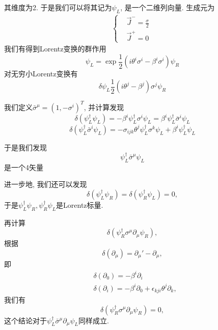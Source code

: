 \begin{example}
    其维度为2. 于是我们可以将其记为$\psi_L$, 是一个二维列向量. 生成元为
    \begin{align}
        \begin{cases}
            &\vec J^-=\frac{\sigma}2\\
            &\vec J^+=0\
        \end{cases}
    \end{align}
    我们有得到Lorentz变换的群作用
    \begin{equation}
        \psi_L=\exp{\frac12(i\theta^i\sigma^i-\beta^i\sigma^i)}\psi_R        
    \end{equation}
    对无穷小Lorentz变换有
    \begin{equation}
        \delta\psi_L\frac12(i\theta^j-\beta^j)\sigma^j\psi_R
    \end{equation}

    我们定义$\bar\sigma^\mu=(1, -\sigma^i)^T$, 并计算发现
    \begin{equation}
        \delta(\psi_L^\dagger\psi_L)=-\beta^i\psi_L^\dagger\sigma^i\psi_L=\beta^i\psi_L^\dagger\bar\sigma^i\psi_L
    \end{equation}
    \begin{equation}
        \delta(\psi_L^\dagger\bar\sigma^i\psi_L)=-\sigma_{ijk}\theta^j\psi_L^\dagger\sigma^k\psi_L+\beta^i\psi_L^\dagger\psi_L
    \end{equation}

    于是我们发现
    \begin{equation}
        \psi_L^\dagger\bar\sigma^\mu\psi_L
    \end{equation}
    是一个4矢量
\end{example}

进一步地, 我们还可以发现
\begin{equation}
    \delta(\psi_L^\dagger\psi_R)=\delta(\psi_R^\dagger\psi_L)=0,
\end{equation}
于是$\psi_L^\dagger\psi_R, \psi_R^\dagger\psi_L$是Lorentz标量.

再计算
\begin{equation}
    \delta(\psi^\dagger_R\sigma^\mu\partial_\mu\psi_R),
\end{equation}
根据
\begin{equation}
    \delta(\partial_\mu)=\partial_\mu'-\partial_\mu,
\end{equation}
即
\begin{align}
    &\delta(\partial_0)=-\beta^i\partial_i\\
    &\delta(\partial_i)=-\beta^i\partial_0+\epsilon_{kji}\theta^j\partial_k,
\end{align}
我们有
\begin{equation}
    \delta(\psi^\dagger_R\sigma^\mu\partial_\mu\psi_R)=0,
\end{equation}
这个结论对于$\psi^\dagger_L\bar\sigma^\mu\partial_\mu\psi_L$同样成立.

